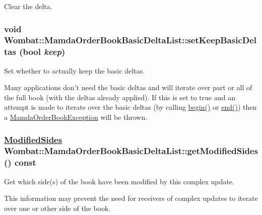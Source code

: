 Clear the delta. 

\hypertarget{classWombat_1_1MamdaOrderBookBasicDeltaList_8b498ce63ea3bcc637029ad027780290}{
\subsubsection[setKeepBasicDeltas]{\setlength{\rightskip}{0pt plus 5cm}void Wombat::Mamda\-Order\-Book\-Basic\-Delta\-List::set\-Keep\-Basic\-Deltas (bool {\em keep})}}
\label{classWombat_1_1MamdaOrderBookBasicDeltaList_8b498ce63ea3bcc637029ad027780290}


Set whether to actually keep the basic deltas. 

Many applications don't need the basic deltas and will iterate over part or all of the full book (with the deltas already applied). If this is set to true and an attempt is made to iterate over the basic deltas (by calling \hyperlink{classWombat_1_1MamdaOrderBookBasicDeltaList_3f3f6c9249cde8c9505e07ad9fdfd915}{begin()} or \hyperlink{classWombat_1_1MamdaOrderBookBasicDeltaList_ea13d67de0766413616ddb6274e2bc18}{end()}) then a \hyperlink{classWombat_1_1MamdaOrderBookException}{Mamda\-Order\-Book\-Exception} will be thrown. \hypertarget{classWombat_1_1MamdaOrderBookBasicDeltaList_0b6da5bf442b01229a32207689da622b}{
\subsubsection[getModifiedSides]{\setlength{\rightskip}{0pt plus 5cm}\hyperlink{classWombat_1_1MamdaOrderBookBasicDeltaList_2edf0c7bea33ef46dc4071a9a4722ad1}{Modified\-Sides} Wombat::Mamda\-Order\-Book\-Basic\-Delta\-List::get\-Modified\-Sides () const}}
\label{classWombat_1_1MamdaOrderBookBasicDeltaList_0b6da5bf442b01229a32207689da622b}


Get which side(s) of the book have been modified by this complex update. 

This information may prevent the need for receivers of complex updates to iterate over one or other side of the book.

